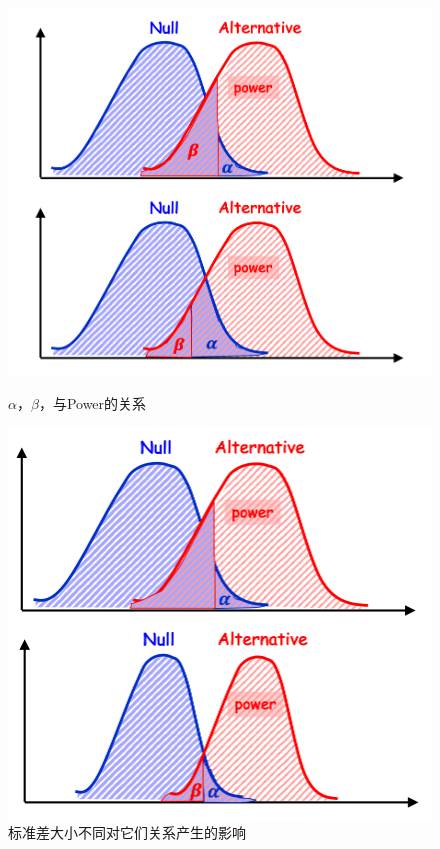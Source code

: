 \documentclass[UTF8]{ctexbook}
\begin{document}
\begin{figure}[h]
    \centering
    \begin{minipage}{0.45\textwidth}
        \centering
        \includegraphics[width = \textwidth]{Figures/Figure 1.png} %
        \caption{$\alpha$，$\beta$，与Power的关系}
		\label{fig:Power_alpha_beta}
    \end{minipage}
    \hfill
    \begin{minipage}{0.45\textwidth}
        \centering
        \includegraphics[width = \textwidth]{Figures/Figure 2.png} %
        \caption{标准差大小不同对它们关系产生的影响}
		\label{fig:Power_SE}
    \end{minipage}
\end{figure}
\end{document}
